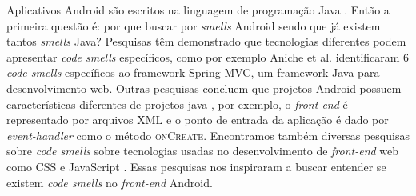 Aplicativos Android s\~ao escritos na linguagem de programa\c{c}\~ao Java \cite{AndroidFundamentals}. Ent\~ao a primeira quest\~ao \'e: por que buscar por \textit{smells} Android sendo que j\'a existem tantos \textit{smells} Java? Pesquisas t\^em demonstrado que tecnologias diferentes podem apresentar \textit{code smells} espec\'ificos, como por exemplo Aniche et al. identificaram 6 \textit{code smells} espec\'ificos ao framework Spring MVC, um framework Java para desenvolvimento web. Outras pesquisas concluem que projetos Android possuem caracter\'isticas diferentes de projetos java \cite{Hecht2015, Mannan_Dig_Ahmed_Jensen_Abdullah_Almurshed, ReimannBrylski2013}, por exemplo, o \textit{front-end} \'e representado por arquivos XML e o ponto de entrada da aplica\c{c}\~ao \'e dado por \textit{event-handler} \cite{AndroidActivities2016} como o m\'etodo \textsc{onCreate}. Encontramos tamb\'em diversas pesquisas sobre \textit{code smells} sobre tecnologias usadas no desenvolvimento de \textit{front-end} web como CSS \cite{CSSCodeSmell} e JavaScript \cite{BB}. Essas pesquisas nos inspiraram a buscar entender se existem \textit{code smells} no \textit{front-end} Android. \\

